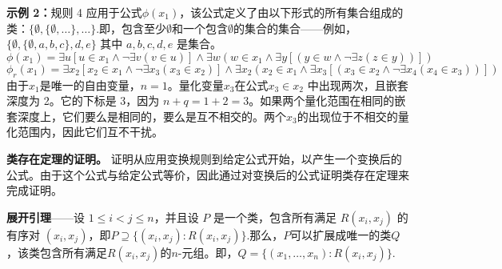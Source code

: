 \textbf{示例 2：}规则 4 应用于公式\( \phi(x_1) \)，该公式定义了由以下形式的所有集合组成的类：\(\{\emptyset, \{\emptyset, \dots\}, \dots\}\).即，包含至少\( \emptyset \)和一个包含\( \emptyset \)的集合的集合——例如，\(\{\emptyset, \{\emptyset, a, b, c\}, d, e\}\)
其中 \( a, b, c, d, e \) 是集合。  
\[
\phi(x_1) = \exists u \left[ u \in x_1 \land \neg \exists v (v \in u) \right] \land \exists w \left(w \in x_1 \land \exists y \left[ (y \in w \land \neg \exists z (z \in y)) \right] \right)~
\]  
\[
\phi_r(x_1) = \exists x_2 \left[ x_2 \in x_1 \land \neg \exists x_3 (x_3 \in x_2) \right] \land \exists x_2 \left(x_2 \in x_1 \land \exists x_3 \left[ (x_3 \in x_2 \land \neg \exists x_4 (x_4 \in x_3)) \right] \right)~
\]
由于\( x_1 \)是唯一的自由变量，\( n = 1 \)。量化变量\( x_3 \)在公式\( x_3 \in x_2 \) 中出现两次，且嵌套深度为 2。它的下标是 3，因为 \( n + q = 1 + 2 = 3 \)。如果两个量化范围在相同的嵌套深度上，它们要么是相同的，要么是互不相交的。两个\( x_3 \)的出现位于不相交的量化范围内，因此它们互不干扰。

\textbf{类存在定理的证明。} 证明从应用变换规则到给定公式开始，以产生一个变换后的公式。由于这个公式与给定公式等价，因此通过对变换后的公式证明类存在定理来完成证明。

\textbf{展开引理}——设 \( 1 \leq i < j \leq n \)，并且设 \( P \) 是一个类，包含所有满足 \( R(x_i, x_j) \) 的有序对 \( (x_i, x_j) \)，即\(P \supseteq \{(x_i, x_j) : R(x_i, x_j)\}\).那么，\( P \)可以扩展成唯一的类\( Q \)，该类包含所有满足\( R(x_i, x_j) \)的\( n \)-元组。即，\(Q = \{(x_1, \ldots, x_n) : R(x_i, x_j)\}\).


